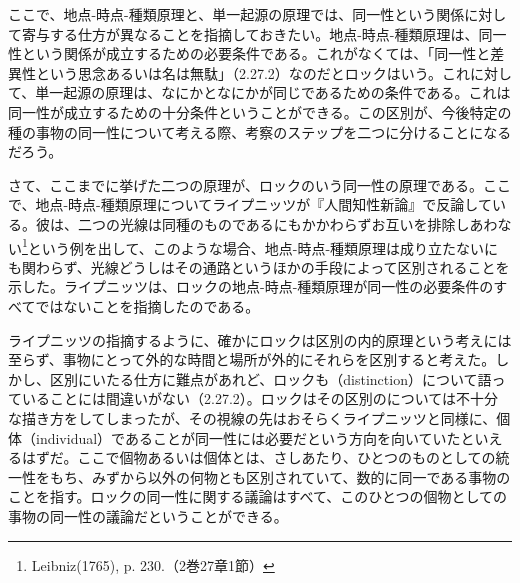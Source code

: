 \documentclass[a4j,oneside]{jsbook}
\begin{document}
\par
ここで、地点-時点-種類原理と、単一起源の原理では、同一性という関係に対して寄与する仕方が異なることを指摘しておきたい。地点-時点-種類原理は、同一性という関係が成立するための必要条件である。これがなくては、「同一性と差異性という思念あるいは名は無駄」（2.27.2）なのだとロックはいう。これに対して、単一起源の原理は、なにかとなにかが同じであるための条件である。これは同一性が成立するための十分条件ということができる。この区別が、今後特定の種の事物の同一性について考える際、考察のステップを二つに分けることになるだろう。
\par
さて、ここまでに挙げた二つの原理が、ロックのいう同一性の原理である。ここで、地点-時点-種類原理についてライプニッツが『人間知性新論』で反論している。彼は、二つの光線は同種のものであるにもかかわらずお互いを排除しあわない\footnote{Leibniz(1765), p. 230.（2巻27章1節）}という例を出して、このような場合、地点-時点-種類原理は成り立たないにも関わらず、光線どうしはその通路というほかの手段によって区別されることを示した。ライプニッツは、ロックの地点-時点-種類原理が同一性の必要条件のすべてではないことを指摘したのである。
\par
ライプニッツの指摘するように、確かにロックは区別の内的原理という考えには至らず、事物にとって外的な時間と場所が外的にそれらを区別すると考えた。しかし、区別にいたる仕方に難点があれど、ロックも（distinction）について語っていることには間違いがない（2.27.2）。ロックはその区別のについては不十分な描き方をしてしまったが、その視線の先はおそらくライプニッツと同様に、個体（individual）であることが同一性には必要だという方向を向いていたといえるはずだ。ここで個物あるいは個体とは、さしあたり、ひとつのものとしての統一性をもち、みずから以外の何物とも区別されていて、数的に同一である事物のことを指す。ロックの同一性に関する議論はすべて、このひとつの個物としての事物の同一性の議論だということができる。
\end{document}

